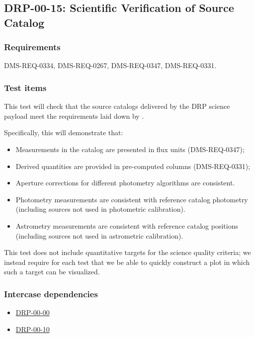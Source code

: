 \subsection{DRP-00-15: Scientific Verification of Source Catalog}
\label{drp-00-15}

\subsubsection{Requirements}

DMS-REQ-0334, DMS-REQ-0267, DMS-REQ-0347, DMS-REQ-0331.

\subsubsection{Test items}
\label{drp-00-15-items}

This test will check that the source catalogs delivered by the DRP science
payload meet the requirements laid down by .

Specifically, this will demonstrate that:

\begin{itemize}

  \item{Measurements in the catalog are presented in flux units
  (DMS-REQ-0347);}
  \item{Derived quantities are provided in pre-computed columns
  (DMS-REQ-0331)};
  \item{Aperture corrections for different photometry algorithms are consistent.}
  \item{Photometry measurements are consistent with reference catalog photometry (including sources not used in photometric calibration).}
  \item{Astrometry measurements are consistent with reference catalog positions (including sources not used in astrometric calibration).}

\end{itemize}

This test does not include quantitative targets for the science quality criteria; we instead require for each test that we be able to quickly construct a plot in which such a target can be visualized.

\subsubsection{Intercase dependencies}

\begin{itemize}

  \item{\hyperref[drp-00-00]{DRP-00-00}}
  \item{\hyperref[drp-00-10]{DRP-00-10}}

\end{itemize}

